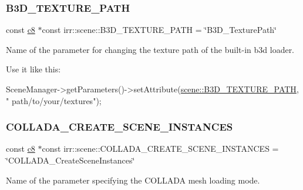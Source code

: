 \subsubsection{\texorpdfstring{B3\+D\+\_\+\+T\+E\+X\+T\+U\+R\+E\+\_\+\+P\+A\+TH}{B3D\_TEXTURE\_PATH}}
{\footnotesize\ttfamily const \hyperlink{namespaceirr_a9395eaea339bcb546b319e9c96bf7410}{c8} $\ast$const irr\+::scene\+::\+B3\+D\+\_\+\+T\+E\+X\+T\+U\+R\+E\+\_\+\+P\+A\+TH = \char`\"{}B3\+D\+\_\+\+Texture\+Path\char`\"{}}



Name of the parameter for changing the texture path of the built-\/in b3d loader. 

Use it like this\+: 
\begin{DoxyCode}
SceneManager->getParameters()->setAttribute(\hyperlink{namespaceirr_1_1scene_aa2ba7f6fbb42b33a21e4083a85772b1b}{scene::B3D\_TEXTURE\_PATH}, \textcolor{stringliteral}{"
      path/to/your/textures"});
\end{DoxyCode}
 \mbox{\label{namespaceirr_1_1scene_ae48f9ce9a33957cc0d86171d6f2e4535}} 
\subsubsection{\texorpdfstring{C\+O\+L\+L\+A\+D\+A\+\_\+\+C\+R\+E\+A\+T\+E\+\_\+\+S\+C\+E\+N\+E\+\_\+\+I\+N\+S\+T\+A\+N\+C\+ES}{COLLADA\_CREATE\_SCENE\_INSTANCES}}
{\footnotesize\ttfamily const \hyperlink{namespaceirr_a9395eaea339bcb546b319e9c96bf7410}{c8} $\ast$const irr\+::scene\+::\+C\+O\+L\+L\+A\+D\+A\+\_\+\+C\+R\+E\+A\+T\+E\+\_\+\+S\+C\+E\+N\+E\+\_\+\+I\+N\+S\+T\+A\+N\+C\+ES = \char`\"{}C\+O\+L\+L\+A\+D\+A\+\_\+\+Create\+Scene\+Instances\char`\"{}}



Name of the parameter specifying the C\+O\+L\+L\+A\+DA mesh loading mode. 

